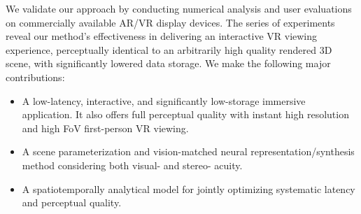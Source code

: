 



We validate our approach by conducting numerical analysis and user evaluations on commercially available AR/VR display devices. The series of experiments reveal our method's effectiveness in delivering an interactive VR viewing experience, perceptually identical to an arbitrarily high quality rendered 3D scene, with significantly lowered data storage. We make the following major contributions:
\begin{itemize}
    \item A low-latency, interactive, and significantly low-storage immersive application. It also offers full perceptual quality with instant high resolution and high FoV first-person VR viewing.
    \item A scene parameterization and vision-matched neural representation/synthesis method considering both visual- and stereo- acuity.
    \item A spatiotemporally analytical model for jointly optimizing systematic latency and perceptual quality.
\end{itemize}
